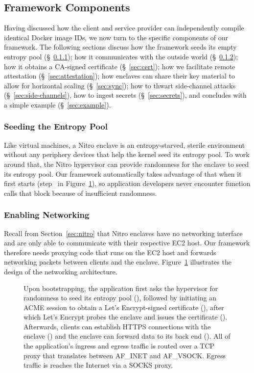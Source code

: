 \subsection{Framework Components}
\label{sec:framework}

Having discussed how the client and service provider can independently compile
identical Docker image IDs, we now turn to the specific components of our
framework.  The following sections discuss how the framework
seeds its empty entropy pool (\S~\ref{sec:entropy});
how it communicates with the outside world (\S~\ref{sec:networking});
how it obtains a CA-signed certificate (\S~\ref{sec:cert});
how we facilitate remote attestation (\S~\ref{sec:attestation});
how enclaves can share their key material to allow for horizontal scaling (\S~\ref{sec:sync});
how to thwart side-channel attacks (\S~\ref{sec:side-channels}),
how to ingest secrets (\S~\ref{sec:secrets}), and
concludes with a simple example (\S~\ref{sec:example}).

\subsubsection{Seeding the Entropy Pool}
\label{sec:entropy}

Like virtual machines, a Nitro enclave is an entropy-starved, sterile
environment without any periphery devices that help the kernel seed its entropy
pool.  To work around that, the Nitro hypervisor can provide randomness for the
enclave to seed its entropy pool.  Our framework automatically takes advantage
of that when it first starts (step~ in Figure~\ref{fig:networking}),
so application developers never encounter function calls that block because of
insufficient randomness.

\subsubsection{Enabling Networking}
\label{sec:networking}

Recall from Section~\ref{sec:nitro} that Nitro enclaves have no networking
interface and are only able to communicate with their respective EC2 host.  Our
framework therefore needs proxying code that runs on the EC2 host and forwards
networking packets between clients and the enclave.  Figure~\ref{fig:networking}
illustrates the design of the networking architecture.

\begin{figure}[t]
\centering

\caption{Upon bootstrapping, the application first asks the hypervisor for
  randomness to seed its entropy pool (), followed by initiating an
  ACME session to obtain a Let's Encrypt-signed certificate (), after
  which Let's Encrypt probes the enclave and issues the certificate
  ().  Afterwards, clients can establish HTTPS connections with the
  enclave () and the enclave can forward data to its back end
  ().  All of the application's ingress and egress  traffic is routed
  over a TCP proxy that translates between AF\_INET and AF\_VSOCK.  Egress
  traffic is reaches the Internet via a SOCKS proxy.}
\label{fig:networking}
\end{figure}

